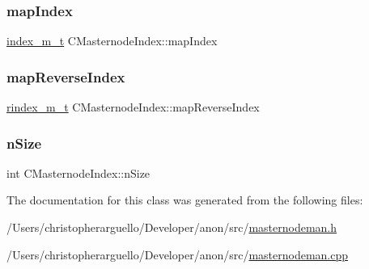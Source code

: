 \subsubsection{\texorpdfstring{map\+Index}{mapIndex}}
{\footnotesize\ttfamily \mbox{\hyperlink{class_c_masternode_index_a78c666dcc663fceff46cd86f4eb1870c}{index\+\_\+m\+\_\+t}} C\+Masternode\+Index\+::map\+Index\hspace{0.3cm}{\ttfamily [private]}}

\mbox{\label{class_c_masternode_index_af395a77efe7661aed5460ea1d478c6fd}} 
\subsubsection{\texorpdfstring{map\+Reverse\+Index}{mapReverseIndex}}
{\footnotesize\ttfamily \mbox{\hyperlink{class_c_masternode_index_ad04aa24155d452c5c222562c0f3c3e21}{rindex\+\_\+m\+\_\+t}} C\+Masternode\+Index\+::map\+Reverse\+Index\hspace{0.3cm}{\ttfamily [private]}}

\mbox{\label{class_c_masternode_index_a4df94f8851340cea142139c8490e9a1e}} 
\subsubsection{\texorpdfstring{n\+Size}{nSize}}
{\footnotesize\ttfamily int C\+Masternode\+Index\+::n\+Size\hspace{0.3cm}{\ttfamily [private]}}



The documentation for this class was generated from the following files\+:\begin{DoxyCompactItemize}
\item 
/\+Users/christopherarguello/\+Developer/anon/src/\mbox{\hyperlink{masternodeman_8h}{masternodeman.\+h}}\item 
/\+Users/christopherarguello/\+Developer/anon/src/\mbox{\hyperlink{masternodeman_8cpp}{masternodeman.\+cpp}}\end{DoxyCompactItemize}
